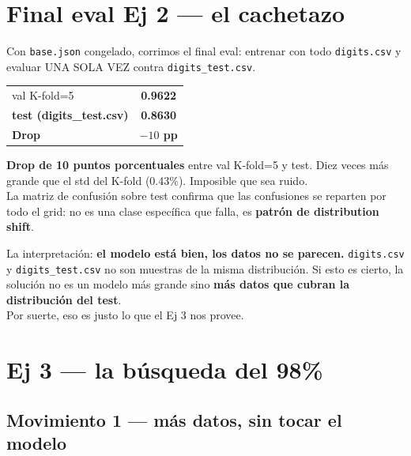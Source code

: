 \documentclass[11pt,a4paper]{article}
\newcommand{\code}[1]{\texttt{\textcolor{accent}{#1}}}
\begin{document}
\section{Final eval Ej 2 — el cachetazo}

Con \code{base.json} congelado, corrimos el final eval: entrenar con todo \code{digits.csv} y evaluar UNA SOLA VEZ contra \code{digits\_test.csv}.

\begin{center}
\large
\begin{tabular}{@{}lc@{}}
\toprule
val K-fold=5         & \textbf{0.9622} \\
\textbf{test (digits\_test.csv)} & \cellcolor{warn!10}\textbf{0.8630} \\
\textbf{Drop}        & \cellcolor{warn!10}\textbf{$-10$ pp} \\
\bottomrule
\end{tabular}
\end{center}

\begin{sorpresa}
\textbf{Drop de 10 puntos porcentuales} entre val K-fold=5 y test. Diez veces más grande que el std del K-fold (0.43\%). Imposible que sea ruido. \\[0.2em]
La matriz de confusión sobre test confirma que las confusiones se reparten por todo el grid: no es una clase específica que falla, es \textbf{patrón de distribution shift}.
\end{sorpresa}

\begin{aprendimos}
La interpretación: \textbf{el modelo está bien, los datos no se parecen.} \code{digits.csv} y \code{digits\_test.csv} no son muestras de la misma distribución. Si esto es cierto, la solución no es un modelo más grande sino \textbf{más datos que cubran la distribución del test}. \\[0.2em]
Por suerte, eso es justo lo que el Ej 3 nos provee.
\end{aprendimos}

\section{Ej 3 — la búsqueda del 98\%}

\subsection{Movimiento 1 — más datos, sin tocar el modelo}
\end{document}
